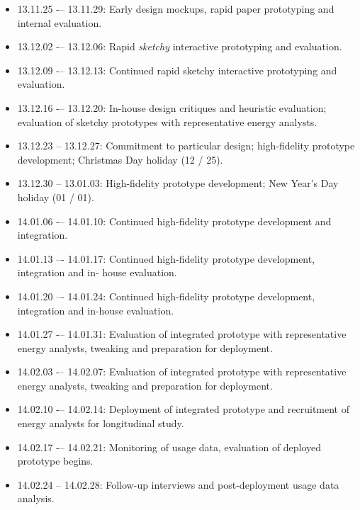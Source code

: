 
\begin{itemize}
    \item 13.11.25 -– 13.11.29: Early design mockups, rapid paper prototyping and internal evaluation.
    \item 13.12.02 -– 13.12.06: Rapid {\it sketchy} interactive prototyping and evaluation.
    \item 13.12.09 -– 13.12.13: Continued rapid sketchy interactive prototyping and evaluation.
    \item 13.12.16 -– 13.12.20: In-house design critiques and heuristic evaluation; evaluation of sketchy prototypes with representative energy analysts.
\end{itemize}


\begin{itemize}
    \item 13.12.23 -- 13.12.27: Commitment to particular design; high-fidelity prototype development; Christmas Day holiday (12 / 25).
    \item 13.12.30 -- 13.01.03: High-fidelity prototype development; New Year’s Day holiday (01 / 01).
    \item 14.01.06 -– 14.01.10: Continued high-fidelity prototype development and integration.
    \item 14.01.13 –- 14.01.17: Continued high-fidelity prototype development, integration and in- house evaluation.
    \item 14.01.20 –- 14.01.24: Continued high-fidelity prototype development, integration and in-house evaluation.
\end{itemize}


\begin{itemize}
    \item 14.01.27 -– 14.01.31: Evaluation of integrated prototype with representative energy analysts, tweaking and preparation for deployment.
    \item 14.02.03 -– 14.02.07: Evaluation of integrated prototype with representative energy analysts, tweaking and preparation for deployment.
    \item 14.02.10 -– 14.02.14: Deployment of integrated prototype and recruitment of energy analysts for longitudinal study.
    \item 14.02.17 -– 14.02.21: Monitoring of usage data, evaluation of deployed prototype begins.
    \item 14.02.24 -- 14.02.28: Follow-up interviews and post-deployment usage data analysis.
\end{itemize}

